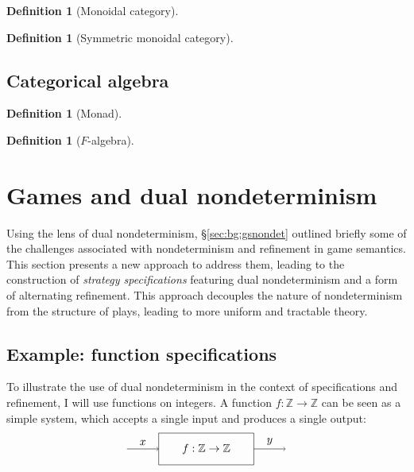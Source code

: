 \documentclass[draft,11pt]{report}
\theoremstyle{definition}
\newtheorem{definition}[theorem]{Definition}
\begin{document}
\begin{definition}[Monoidal category]
\end{definition}

\begin{definition}[Symmetric monoidal category]
\end{definition}

\section{Categorical algebra}

\begin{definition}[Monad]
\end{definition}

\begin{definition}[$F$-algebra]
\end{definition}




\chapter{Games and dual nondeterminism} \label{sec:games-dnd} %

Using the lens of dual nondeterminism,
\S\ref{sec:bg:gsnondet} outlined briefly some of the challenges
associated with nondeterminism and refinement in game semantics.
This section presents a new approach to address them,
leading to the construction of \emph{strategy specifications}
featuring dual nondeterminism and a form of alternating refinement.
This approach decouples the nature of nondeterminism
from the structure of plays,
leading to more uniform and tractable theory.

\section{Example: function specifications} \label{sec:fspec} %

To illustrate the use of dual nondeterminism
in the context of specifications and refinement,
I will use functions on integers.
A function $f : \mathbb{Z} \rightarrow \mathbb{Z}$
can be seen as a simple system,
which accepts a single input and produces a single output:
\[
  \begin{tikzpicture}[scale=0.5]
    \draw (-3, -1) rectangle (3, 1);
    \node at (0,0) {$f : \mathbb{Z} \rightarrow \mathbb{Z}$};
    \draw[->] (-5,0) -- node[above] {$x$} (-3,0);
    \draw[->] (3,0) -- node[above] {$y$} (5,0);
  \end{tikzpicture}
\]
\end{document}
